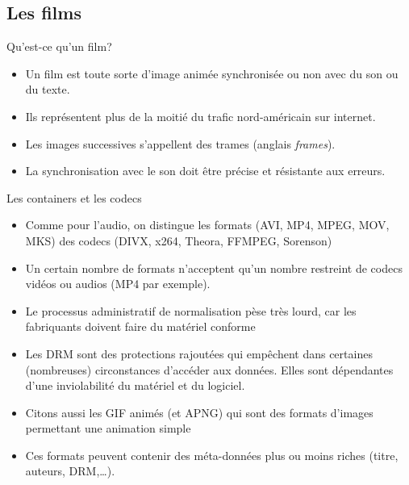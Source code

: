 \subsection{Les films}
\begin{frame}{Qu'est-ce qu'un film?}
  \begin{itemize}
  \item Un film est toute sorte d'image animée synchronisée ou non avec du son
    ou du texte.
  \item[\dialogwarning] Ils représentent plus de la moitié du trafic
    nord-américain sur internet.
  \item Les images successives s'appellent des trames (anglais \emph{frames}).
  \item La synchronisation avec le son doit être précise et résistante aux
    erreurs.
  \end{itemize}
\end{frame}
\begin{frame}{Les containers et les codecs}
  \begin{itemize}
  \item Comme pour l'audio, on distingue les formats (AVI, MP4, MPEG, MOV,
    MKS) des codecs (DIVX, x264, Theora, FFMPEG, Sorenson)
  \item Un certain nombre de formats n'acceptent qu'un nombre restreint de
    codecs vidéos ou audios (MP4 par exemple).
  \item Le processus administratif de normalisation pèse très lourd, car les
    fabriquants doivent faire du matériel conforme
  \item Les DRM sont des protections rajoutées qui empêchent dans certaines
    (nombreuses) circonstances d'accéder aux données. Elles sont dépendantes
    d'une inviolabilité du matériel et du logiciel.
  \item Citons aussi les GIF animés (et APNG) qui sont des formats d'images
    permettant une animation simple
  \item Ces formats peuvent contenir des méta-données plus ou moins riches
    (titre, auteurs, DRM,\dots).
  \end{itemize}
\end{frame}
